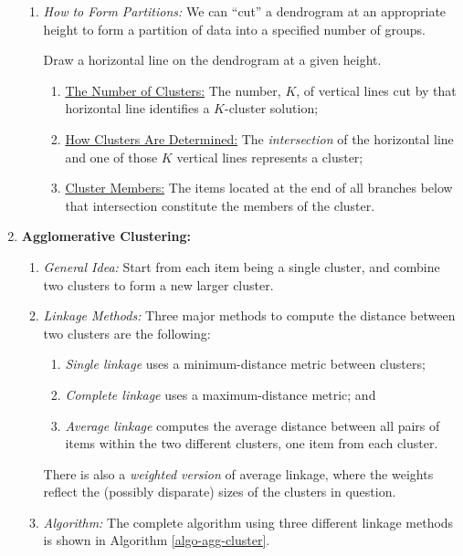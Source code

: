 \documentclass[12pt]{article}
\begin{document}
\begin{enumerate}[label=\textbf{\arabic*.}]
\begin{enumerate}
		\item \textit{How to Form Partitions:} We can ``cut'' a dendrogram at an appropriate height to form a partition of data into a specified number of groups. 
		
		Draw a horizontal line on the dendrogram at a given height. 
		\begin{enumerate}
			\item \underline{The Number of Clusters:} The number, $K$, of vertical lines cut by that horizontal line identifies a $K$-cluster solution; 
			\item \underline{How Clusters Are Determined:} The \emph{intersection} of the horizontal line and one of those $K$ vertical lines represents a cluster; 
			\item \underline{Cluster Members:} The items located at the end of all branches below that intersection constitute the members of the cluster. 
		\end{enumerate}
		
	\end{enumerate}
	
	\item \textbf{Agglomerative Clustering:} 
	\begin{enumerate}
		\item \textit{General Idea:} Start from each item being a single cluster, and combine two clusters to form a new larger cluster. 
		
		\item \textit{Linkage Methods:} Three major methods to compute the distance between two clusters are the following: 
		\begin{enumerate}
			\item \emph{Single linkage} uses a minimum-distance metric between clusters; 
			\item \emph{Complete linkage} uses a maximum-distance metric; and 
			\item \emph{Average linkage} computes the average distance between all pairs of items within the two different clusters, one item from each cluster. 
		\end{enumerate}
		There is also a \emph{weighted version} of average linkage, where the weights reflect the (possibly disparate) sizes of the clusters in question. 
		
		\item \textit{Algorithm:} The complete algorithm using three different linkage methods is shown in Algorithm \ref{algo-agg-cluster}. 
		

\end{enumerate}
\end{enumerate}
\end{document}
